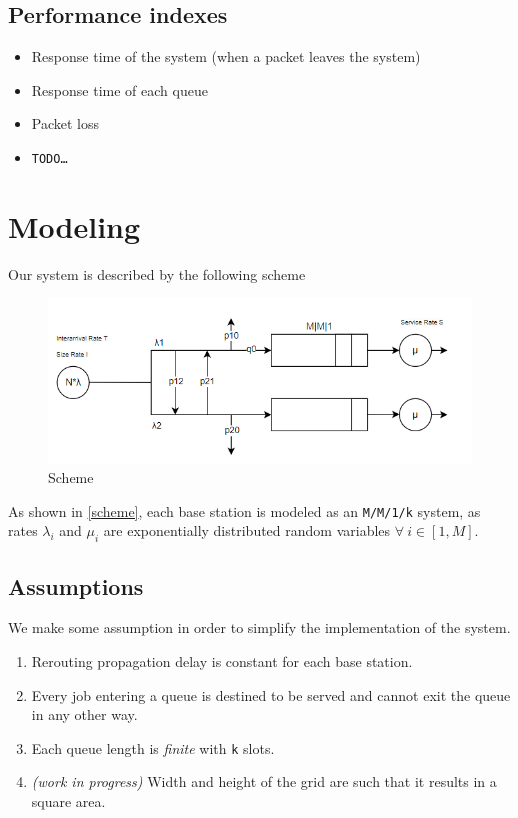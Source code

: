 \documentclass{report}
\begin{document}
\section{Performance indexes}
\begin{itemize}
    \item Response time of the system (when a packet leaves the system)
    \item Response time of each queue
    \item Packet loss
    \item \texttt{TODO\dots}
\end{itemize}

\chapter{Modeling}
Our system is described by the following scheme
\begin{figure}[H]
    \centering
    \includegraphics[width=\textwidth]{img/immagine.png}
    \caption{Scheme}
    \label{scheme}
\end{figure}

As shown in \autoref{scheme}, each base station is modeled as an \texttt{M/M/1/k} system, as rates $\lambda_i$ and $\mu_i$ are exponentially distributed random variables $\forall \ i \in [1, M]$.

\section{Assumptions}
We make some assumption in order to simplify the implementation of the system.

\begin{enumerate}
    \item Rerouting propagation delay is constant for each base station.
    \item Every job entering a queue is destined to be served and cannot exit the queue in any other way.
    \item Each queue length is \textit{finite} with \texttt{k} slots.
    \item \textit{(work in progress)} Width and height of the grid are such that it results in a square area.
\end{enumerate}
\end{document}
